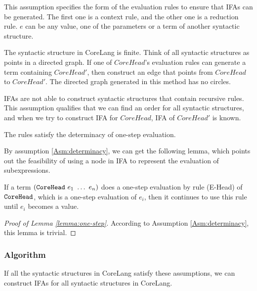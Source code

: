 This assumption specifies the form of the evaluation rules to ensure that IFAs can be generated. The first one is a context rule, and the other one is a reduction rule. $e$ can be any value, one of the parameters or a term of another syntactic structure.

\begin{Asm}
\label{Asm:orderliness}
The syntactic structure in CoreLang is finite. Think of all syntactic structures as points in a directed graph. If one of $CoreHead$'s evaluation rules can generate a term containing $CoreHead'$, then construct an edge that points from $CoreHead$ to $CoreHead'$. The directed graph generated in this method has no circles.
\end{Asm}

IFAs are not able to construct syntactic structures that contain recursive rules. This assumption qualifies that we can find an order for all syntactic structures, and when we try to construct IFA for $CoreHead$, IFA of $CoreHead'$ is known.

\begin{Asm}
\label{Asm:determinacy}
The rules satisfy the determinacy of one-step evaluation.
\end{Asm}

By assumption \ref{Asm:determinacy}, we can get the following lemma, which points out the feasibility of using a node in IFA to represent the evaluation of subexpressions.

\begin{lemma}
\label{lemma:one-step}
If a term $(\mbox{\tt CoreHead}~e_1~\ldots~e_n)$ does a one-step evaluation by rule (E-Head) of $\mbox{\tt CoreHead}$, which is a one-step evaluation of $e_i$, then it continues to use this rule until $e_i$ becomes a value.
\end{lemma}

\begin{proof}[Proof of Lemma \ref{lemma:one-step}]
According to Assumption \ref{Asm:determinacy}, this lemma is trivial.
\end{proof}

\subsubsection{Algorithm}

\begin{mythm}
\label{mythm:Rule2IFA}
If all the syntactic structures in CoreLang satisfy these assumptions, we can construct IFAs for all syntactic structures in CoreLang.
\end{mythm}


